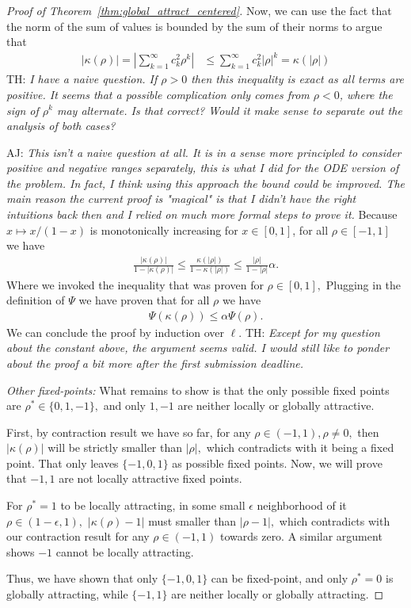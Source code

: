 \documentclass[twoside]{article}
\theoremstyle{definition}
\newcommand{\thomas}[1]{{\color{blue}TH:  \textit{#1}}}
\newcommand{\amir}[1]{{\color{cyan}AJ:  \textit{#1}}}
\begin{document}
\begin{proof}[Proof of Theorem~\ref{thm:global_attract_centered}]

 Now, we can use the fact that the norm of the sum of values is bounded by the sum of their norms to argue that 
\begin{align*}
 |\kappa(\rho)|=|\sum_{k=1}^\infty c_k^2 \rho^k | &\le \sum_{k=1}^\infty c_k^2 |\rho|^k 
 = \kappa(|\rho|)
\end{align*}
\thomas{I have a naive question. If $\rho > 0$ then this inequality is exact as all terms are positive. It seems that a possible complication only comes from $\rho<0$, where the sign of $\rho^k$ may alternate. Is that correct? Would it make sense to separate out the analysis of both cases?}

\amir{This isn't a naive question at all. It is in a sense more principled to consider positive and negative ranges separately, this is what I did for the ODE version of the problem. In fact, I think using this approach the bound could be improved. 
The main reason the current proof is "magical" is that I didn't have the right intuitions back then and I relied on much more formal steps to prove it. }
 Because $x\mapsto x/(1-x)$ is monotonically increasing for $x\in[0,1]$, for all $\rho\in[-1,1]$ we have 
    \begin{align*}
 \frac{|\kappa(\rho)|}{1-|\kappa(\rho)|}\le \frac{\kappa(|\rho|)}{1-\kappa(|\rho|)} \le \frac{|\rho|}{1-|\rho|}\alpha.
    \end{align*}
Where we invoked the inequality that was proven for $\rho\in[0,1], $ Plugging in the definition of $\Psi$ we have proven that for all $\rho$ we have
\begin{align*}
    \Psi(\kappa(\rho)) \le \alpha \Psi(\rho).
\end{align*}
We can conclude the proof by induction over $\ell.$
\thomas{Except for my question about the constant above, the argument seems valid. I would still like to ponder about the proof a bit more after the first submission deadline.}

\textit{Other fixed-points:}
What remains to show is that the only possible fixed points are $\rho^* \in \{0,1,-1\},$ and only $1,-1$ are neither locally or globally attractive.  

First, by contraction result we have so far, for any $\rho \in (-1,1),\rho\neq 0,$ then $|\kappa(\rho)|$ will be strictly smaller than $|\rho|,$ which contradicts with it being a fixed point. That only leaves $\{-1,0,1\}$ as possible fixed points. Now, we will prove that $-1,1$ are not locally attractive fixed points. 

For $\rho^*=1$ to be locally attracting, in some small $\epsilon$ neighborhood of it $\rho\in(1-\epsilon,1),$ $|\kappa(\rho)-1|$ must smaller than $|\rho-1|,$ which contradicts with our contraction result for any $\rho \in (-1,1)$ towards zero. A similar argument shows $-1$ cannot be locally attracting. 

Thus, we have shown that only $\{-1,0,1\}$ can be fixed-point, and only $\rho^*=0$ is globally attracting, while $\{-1,1\}$ are neither locally or globally attracting. 
\end{proof}
\end{document}
